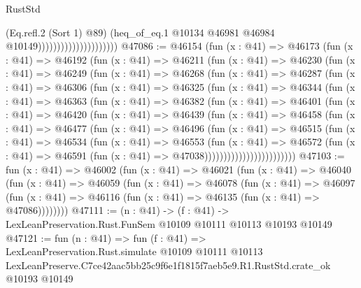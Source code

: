 \begin{lexlean}{RustStd}
\begin{coremodule}
                                            (Eq.refl.{2} (Sort 1) @89)
                                            (heq_of_eq.{1}
                                              @10134
                                              @46981
                                              @46984
                                              @10149)))))))))))))))))))))
@47086 := @46154
    (fun (x : @41) =>
    @46173
      (fun (x : @41) =>
      @46192
        (fun (x : @41) =>
        @46211
          (fun (x : @41) =>
          @46230
            (fun (x : @41) =>
            @46249
              (fun (x : @41) =>
              @46268
                (fun (x : @41) =>
                @46287
                  (fun (x : @41) =>
                  @46306
                    (fun (x : @41) =>
                    @46325
                      (fun (x : @41) =>
                      @46344
                        (fun (x : @41) =>
                        @46363
                          (fun (x : @41) =>
                          @46382
                            (fun (x : @41) =>
                            @46401
                              (fun (x : @41) =>
                              @46420
                                (fun (x : @41) =>
                                @46439
                                  (fun (x : @41) =>
                                  @46458
                                    (fun (x : @41) =>
                                    @46477
                                      (fun (x : @41) =>
                                      @46496
                                        (fun (x : @41) =>
                                        @46515
                                          (fun (x : @41) =>
                                          @46534
                                            (fun (x : @41) =>
                                            @46553
                                              (fun (x : @41) =>
                                              @46572
                                                (fun (x : @41) =>
                                                @46591
                                                  (fun (x : @41) => @47038))))))))))))))))))))))))
@47103 := fun (x : @41) =>
  @46002
    (fun (x : @41) =>
    @46021
      (fun (x : @41) =>
      @46040
        (fun (x : @41) =>
        @46059
          (fun (x : @41) =>
          @46078
            (fun (x : @41) =>
            @46097
              (fun (x : @41) => @46116 (fun (x : @41) => @46135 (fun (x : @41) => @47086))))))))
@47111 := (n : @41) ->
  (f : @41) -> LexLeanPreservation.Rust.FunSem @10109 @10111 @10113 @10193 @10149
@47121 := fun (n : @41) =>
  fun (f : @41) =>
  LexLeanPreservation.Rust.simulate
    @10109
    @10111
    @10113
    LexLeanPreserve.C7ce42aac5bb25c9f6e1f1815f7aeb5e9.R1.RustStd.crate_ok
    @10193
    @10149
\end{coremodule}
\end{lexlean}
